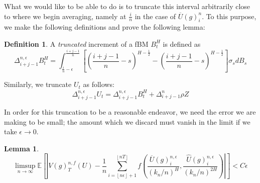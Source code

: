 \documentclass[12pt,letterpaper]{article}
\newtheorem{lemma}{Lemma}
\theoremstyle{definition}
\newtheorem*{definition}{Definition}
\newcommand{\E}{\mathbb{E}}
\begin{document}
What we would like to be able to do is to truncate this interval arbitrarily close to where we begin averaging, namely at \(\frac{i}{n}\) in the case of \(\overline{U}(g)^n_i\). To this purpose, we make the following definitions and prove the following lemma:

\begin{definition}
  A \textit{truncated} increment of a fBM \(B^H_t\) is defined as
  \begin{equation}
    \Delta_{i+j-1}^{n,\epsilon} B^H_t =  \int_{\frac{i}{n}-\epsilon}^{\frac{i+j-1}{n}} \left[ \left( \frac{i+j-1}{n} -s \right)^{H - \frac{1}{2}} - \left( \frac{i+j-1}{n} -s \right)^{H - \frac{1}{2}} \right]\sigma_s dB_s
  \end{equation}

  Similarly, we truncate \(U_t\) as follows:
  \begin{equation}
    \Delta_{i+j-1}^{n,\epsilon} U_t = \Delta_{i+j-1}^{n,\epsilon} B^H_t + \Delta_{i+j-1}^n \rho Z
  \end{equation}
\end{definition}

In order for this truncation to be a reasonable endeavor, we need the error we are making to be small; the amount which we discard must vanish in the limit if we take \(\epsilon \rightarrow 0\).

\begin{lemma}
  \begin{equation}
    \limsup_{n \rightarrow \infty} \E \left[ \left| V(g)^{n,f}_T(U) - \frac{1}{n}\sum_{i=\left\lfloor n\epsilon \right\rfloor + 1}^{\left\lfloor nT \right\rfloor} f\left( \frac{\overline{U}(g)^{n,\epsilon}_i}{(k_n/n)^H}, \frac{\widehat{U}(g)^{n,\epsilon}_i}{(k_n/n)^{2H}} \right) \right| \right] < C\epsilon
  \end{equation}
\end{lemma}
\end{document}
